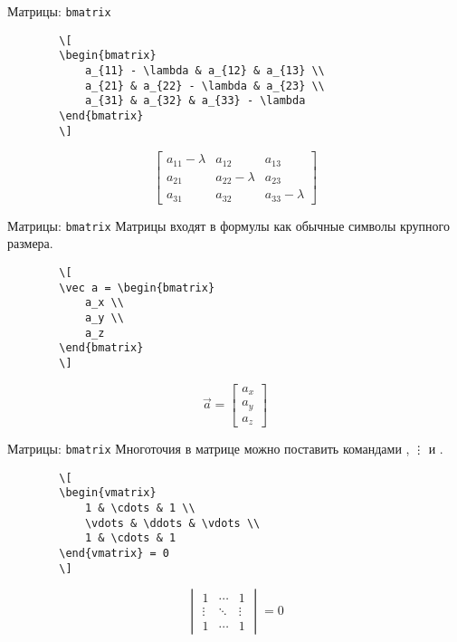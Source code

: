 \begin{frame}[fragile]{Матрицы: \texttt{bmatrix}}
	\begin{verbatim}
		\[
		\begin{bmatrix}
			a_{11} - \lambda & a_{12} & a_{13} \\
			a_{21} & a_{22} - \lambda & a_{23} \\
			a_{31} & a_{32} & a_{33} - \lambda
		\end{bmatrix}
		\]
	\end{verbatim}
	\Large
	\[
	\begin{bmatrix}
		a_{11} - \lambda & a_{12} & a_{13} \\
		a_{21} & a_{22} - \lambda & a_{23} \\
		a_{31} & a_{32} & a_{33} - \lambda
	\end{bmatrix}
	\]
\end{frame}


\begin{frame}[fragile]{Матрицы: \texttt{bmatrix}}
	Матрицы входят в формулы как обычные символы крупного размера.
	\begin{verbatim}
		\[
		\vec a = \begin{bmatrix}
			a_x \\
			a_y \\
			a_z 
		\end{bmatrix}
		\]
	\end{verbatim}
	\Large
	\[
	\vec a = 
	\begin{bmatrix}
		a_x \\
		a_y \\
		a_z 
	\end{bmatrix}
	\]
\end{frame}


\begin{frame}[fragile]{Матрицы: \texttt{bmatrix}}
	Многоточия в матрице можно поставить командами \texttt{\cdots}, \texttt{\vdots} и \texttt{\ddots}.
	
	\begin{verbatim}
		\[
		\begin{vmatrix}
			1 & \cdots & 1 \\
			\vdots & \ddots & \vdots \\
			1 & \cdots & 1  
		\end{vmatrix} = 0
		\]
	\end{verbatim}
	\Large
	\[
	\begin{vmatrix}
		1 & \cdots & 1 \\
		\vdots & \ddots & \vdots \\
		1 & \cdots & 1  
	\end{vmatrix} = 0
	\]
\end{frame}